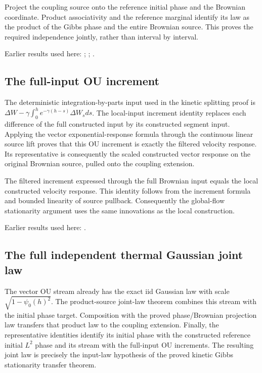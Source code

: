 \documentclass[11pt,a4paper]{report}
\begin{document}
Project the coupling source onto the reference initial phase and the Brownian coordinate. Product associativity and the reference marginal identify its law as the product of the Gibbs phase and the entire Brownian source. This proves the required independence jointly, rather than interval by interval.



Earlier results used here: \cite[Section~3.17.1]{LangevinLean2026ULASC}; \cite[Section~3.8.16]{LangevinLean2026ULASC}; \cite[Section~3.8.17]{LangevinLean2026ULASC}.
\subsection{\texorpdfstring{The full-input OU increment}{The full-input OU increment}}
\label{report-step-KineticLangevin-CanonicalReferenceNoise-lean-2}


The deterministic integration-by-parts input used in the kinetic splitting proof is \(\Delta W-\gamma\int_0^he^{-\gamma(h-s)}\Delta W_sds\). The local-input increment identity replaces each difference of the full constructed input by its constructed segment input. Applying the vector exponential-response formula through the continuous linear source lift proves that this OU increment is exactly the filtered velocity response. Its representative is consequently the scaled constructed vector response on the original Brownian source, pulled onto the coupling extension.



The filtered increment expressed through the full Brownian input equals the local constructed velocity response. This identity follows from the increment formula and bounded linearity of source pullback. Consequently the global-flow stationarity argument uses the same innovations as the local construction.



Earlier results used here: \cite[Section~3.17.1]{LangevinLean2026ULASC}.
\subsection{\texorpdfstring{The full independent thermal Gaussian joint law}{The full independent thermal Gaussian joint law}}
\label{report-step-KineticLangevin-CanonicalReferenceNoise-lean-3}


The vector OU stream already has the exact iid Gaussian law with scale \(\sqrt{1-\psi_0(h)^2}\). The product-source joint-law theorem combines this stream with the initial phase target. Composition with the proved phase/\allowbreak{}Brownian projection law transfers that product law to the coupling extension. Finally, the representative identities identify its initial phase with the constructed reference initial \(L^{2}\) phase and its stream with the full-input OU increments. The resulting joint law is precisely the input-law hypothesis of the proved kinetic Gibbs stationarity transfer theorem.
\end{document}
